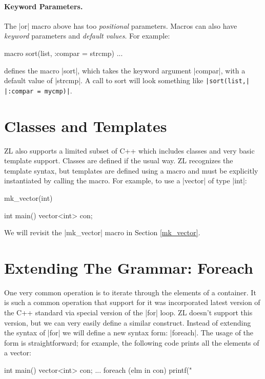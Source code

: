 \paragraph{Keyword Parameters.}

The |or| macro above has too \textit{positional} parameters.  Macros
can also have \textit{keyword} parameters and \textit{default values}.
For example:
\begin{code}
macro sort(list, :compar = strcmp) {...}
\end{code}
defines the macro |sort|, which takes the keyword argument |compar|,
with a default value of |strcmp|.  A call to sort will look something
like {\tt|sort(list,| |:compar = mycmp)|}.

\section{Classes and Templates}
\label{template-intro}

ZL also supports a limited subset of C++ which includes classes and
very basic template support.  Classes are defined if the usual way.  ZL
recognizes the template syntax, but templates are defined using a
macro and must be explicitly instantiated by calling the macro.  For
example, to use a |vector| of type |int|:

\begin{code}
mk_vector(int)

int main() {
  vector<int> con;
}
\end{code}

We will revisit the |mk_vector| macro in Section \ref{mk_vector}.

\section{Extending The Grammar: Foreach}
\label{foreach}

One very common operation is to iterate through the elements of a
container.  It is such a common operation that support for it was
incorporated latest version of the C++ standard via special version of
the |for| loop.  ZL doesn't support this version, but we can very
easily define a similar construct.  Instead of extending the syntax of
|for| we will define a new syntax form: |foreach|.  The usage of the
form is straightforward; for example, the following code prints all the
elements of a vector:
\begin{code}
int main() {
  vector<int> con;
  ...
  foreach (elm in con) {
    printf("%
  }
}
\end{code}

